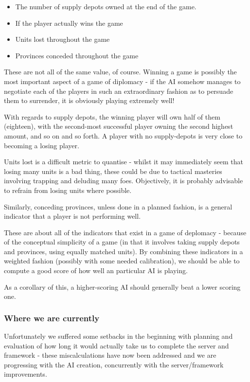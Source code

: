 \documentclass[12pt]{article}
\begin{document}
\begin{itemize}
\item The number of supply depots owned at the end of the game.
\item If the player actually wins the game
\item Units lost throughout the game
\item Provinces conceded throughout the game
\end{itemize}

These are not all of the same value, of course. Winning a game is possibly the most important aspect of a game of diplomacy - if the AI somehow manages to negotiate each of the players in such an extraordinary fashion as to persuade them to surrender, it is obviously playing extremely well! 

With regards to supply depots, the winning player will own half of them (eighteen), with the second-most successful player owning the second highest amount, and so on and so forth. A player with no supply-depots is very close to becoming a losing player.

Units lost is a difficult metric to quantise - whilst it may immediately seem that losing many units is a bad thing, these could be due to tactical masteries involving trapping and deluding many foes. Objectively, it is probably advisable to refrain from losing units where possible.

Similarly, conceding provinces, unless done in a planned fashion, is a general indicator that a player is not performing well.

These are about all of the indicators that exist in a game of deplomacy - because of the conceptual simplicity of a game (in that it involves taking supply depots and provinces, using equally matched units). By combining these indicators in a weighted fashion (possibly with some needed calibration), we should be able to compute a good score of how well an particular AI is playing.

As a corollary of this, a higher-scoring AI should generally beat a lower scoring one.

\subsubsection{Where we are currently}
Unfortunately we suffered some setbacks in the beginning with planning and evaluation of how long it would actually take us to complete the server and framework - these miscalculations have now been addressed and we are progressing with the AI creation, concurrently with the server/framework improvements. 
\end{document}
